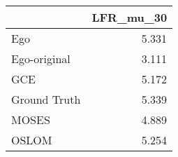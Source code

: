 \begin{tabular}{lr}
\toprule
{} & LFR_mu_30 \\
\midrule
Ego          &     5.331 \\
Ego-original &     3.111 \\
GCE          &     5.172 \\
Ground Truth &     5.339 \\
MOSES        &     4.889 \\
OSLOM        &     5.254 \\
\bottomrule
\end{tabular}
